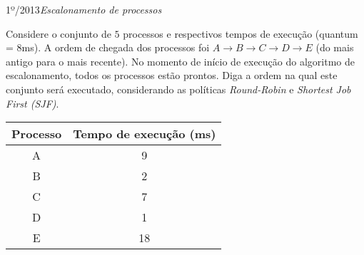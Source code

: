 \begin{exercicio}
  {1º/2013}{\textit{Escalonamento de processos}}
  {Considere o conjunto de $5$ processos e respectivos tempos de execução (quantum = $8$ms). A ordem de chegada dos processos foi $A \rightarrow B \rightarrow C \rightarrow D \rightarrow E$ (do mais antigo para o mais recente). No momento de início de execução do algoritmo de escalonamento, todos os processos estão prontos. Diga a ordem na qual este conjunto será executado, considerando as políticas \textit{Round-Robin} e \textit{Shortest Job First (SJF)}.
  \begin{table}[H]
    \centering
    \begin{tabular}{cc}
      \hline \hline
      \textbf{Processo} & \textbf{Tempo de execução (ms)} \\ \hline
      A                 & 9                               \\
      B                 & 2                              \\
      C                 & 7                               \\
      D                 & 1                               \\
      E                 & 18                              \\ \hline \hline
    \end{tabular}
  \end{table}
  } %
\end{exercicio}

